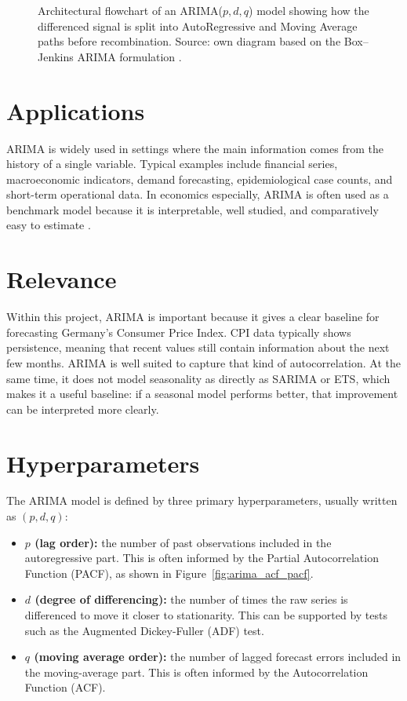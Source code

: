 \begin{figure}[htbp]
\centering

\caption{Architectural flowchart of an ARIMA($p,d,q$) model showing how the differenced signal is split into AutoRegressive and Moving Average paths before recombination. Source: own diagram based on the Box--Jenkins ARIMA formulation \cite{Box2015,Hamilton1994}.}
\label{fig:arima_tikz}
\end{figure}

\section{Applications}
ARIMA is widely used in settings where the main information comes from the history of a single variable. Typical examples include financial series, macroeconomic indicators, demand forecasting, epidemiological case counts, and short-term operational data. In economics especially, ARIMA is often used as a benchmark model because it is interpretable, well studied, and comparatively easy to estimate \cite{Box2015,Hamilton1994}.

\section{Relevance}
Within this project, ARIMA is important because it gives a clear baseline for forecasting Germany's Consumer Price Index. CPI data typically shows persistence, meaning that recent values still contain information about the next few months. ARIMA is well suited to capture that kind of autocorrelation. At the same time, it does not model seasonality as directly as SARIMA or ETS, which makes it a useful baseline: if a seasonal model performs better, that improvement can be interpreted more clearly.

\section{Hyperparameters}
The ARIMA model is defined by three primary hyperparameters, usually written as $(p, d, q)$:
\begin{itemize}
    \item \textbf{$p$ (lag order):} the number of past observations included in the autoregressive part. This is often informed by the Partial Autocorrelation Function (PACF), as shown in Figure~\ref{fig:arima_acf_pacf}.
    \item \textbf{$d$ (degree of differencing):} the number of times the raw series is differenced to move it closer to stationarity. This can be supported by tests such as the Augmented Dickey-Fuller (ADF) test.
    \item \textbf{$q$ (moving average order):} the number of lagged forecast errors included in the moving-average part. This is often informed by the Autocorrelation Function (ACF).
\end{itemize}

